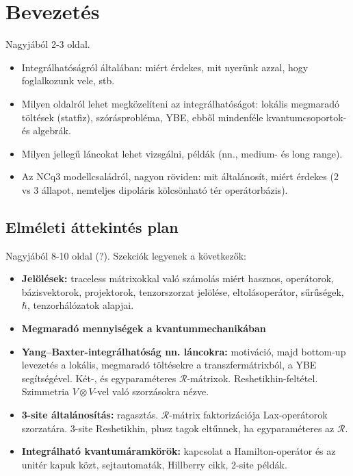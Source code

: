 \documentclass[12pt,a4paper,oneside]{report}
\newcommand{\R}{\mathcal{R}}
\begin{document}


\tableofcontents
\newpage


\chapter{Bevezetés}
Nagyjából 2-3 oldal.
\begin{itemize}
    \item Integrálhatóságról általában: miért érdekes, mit nyerünk azzal, hogy foglalkozunk vele, stb.
    \item Milyen oldalról lehet megközelíteni az integrálhatóságot: lokális megmaradó töltések (statfiz), szórásprobléma, YBE, ebből mindenféle kvantumcsoportok- és algebrák.
    \item Milyen jellegű láncokat lehet vizsgálni, példák (nn., medium- és long range).
    \item Az NCq3 modellcsaládról, nagyon röviden: mit általánosít, miért érdekes (2 vs 3 állapot, nemteljes dipoláris kölcsönható tér operátorbázis).
\end{itemize}

\section{Elméleti áttekintés plan}
Nagyjából 8-10 oldal (?). Szekciók legyenek a következők:
\begin{itemize}
    \item \textbf{Jelölések:} traceless mátrixokkal való számolás miért hasznos, operátorok, bázisvektorok, projektorok, tenzorszorzat jelölése, eltolásoperátor, sűrűségek, $\hbar$, tenzorhálózatok alapjai.
    \item \textbf{Megmaradó mennyiségek a kvantummechanikában}
    \item \textbf{Yang--Baxter-integrálhatóság nn. láncokra:} motiváció, majd bottom-up levezetés a lokális, megmaradó töltésekre a transzfermátrixból, a YBE segítségével. Két-, és egyparaméteres $\R$-mátrixok. Reshetikhin-feltétel. Szimmetria $V\otimes V$-vel való szorzásokra nézve.
    \item \textbf{3-site általánosítás:} ragasztás. $\R$-mátrix faktorizációja Lax-operátorok szorzatára. 3-site Reshetikhin, plusz tagok eltűnnek, ha egyparaméteres az $\R$.
    \item \textbf{Integrálható kvantumáramkörök:} kapcsolat a Hamilton-operátor és az unitér kapuk közt, sejtautomaták, Hillberry cikk, 2-site példák.
\end{itemize}
\newpage
\end{document}
